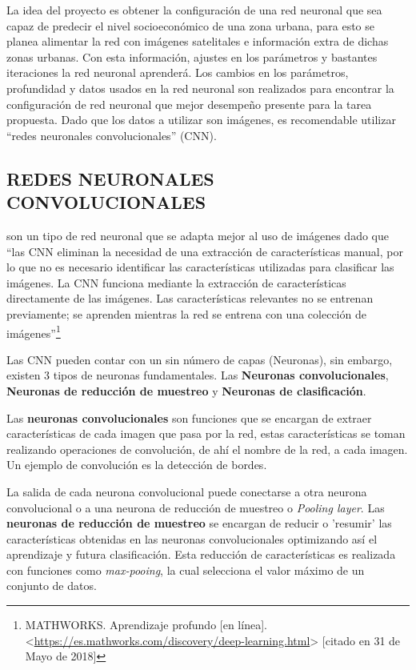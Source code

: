   La idea del proyecto es obtener la configuración de una red neuronal que sea capaz de predecir el nivel socioeconómico de una zona urbana, para esto se planea alimentar la red con imágenes satelitales e información extra de dichas zonas urbanas. Con esta información, ajustes en los parámetros y bastantes iteraciones la red neuronal aprenderá. Los cambios en los parámetros, profundidad y datos usados en la red neuronal son realizados para encontrar la configuración de red neuronal que mejor desempeño presente para la tarea propuesta. Dado que los datos a utilizar son imágenes, es recomendable utilizar “redes neuronales convolucionales” (CNN).
  
 \subsection{REDES NEURONALES CONVOLUCIONALES}   
son un tipo de red neuronal que se adapta mejor al uso de imágenes dado que “las CNN eliminan la necesidad de una extracción de características manual, por lo que no es necesario identificar las características utilizadas para clasificar las imágenes. La CNN funciona mediante la extracción de características directamente de las imágenes. Las características relevantes no se entrenan previamente; se aprenden mientras la red se entrena con una colección de imágenes”\footnote[12]{MATHWORKS. Aprendizaje profundo [en línea]. <\url{https://es.mathworks.com/discovery/deep-learning.html}> [citado en 31 de Mayo de 2018]} 


Las CNN pueden contar con un sin número de capas (Neuronas), sin embargo, existen 3 tipos de neuronas fundamentales. Las \textbf{Neuronas convolucionales}, \textbf{Neuronas de reducción de muestreo} y \textbf{Neuronas de clasificación}.   

Las \textbf{neuronas convolucionales}  son funciones que se encargan de extraer características de cada imagen que pasa por la red, estas características se toman realizando operaciones de convolución, de ahí el nombre de la red, a cada imagen. Un ejemplo de convolución es la detección de bordes.  


La salida de cada neurona convolucional puede conectarse a otra neurona convolucional o a una neurona de reducción de muestreo o \textit{Pooling layer}. Las \textbf{neuronas de reducción de muestreo} se encargan de reducir o 'resumir' las características obtenidas en las neuronas convolucionales optimizando así el aprendizaje y futura clasificación. Esta reducción de características es realizada con funciones como \textit{max-pooing}, la cual selecciona el valor máximo de un conjunto de datos. 

